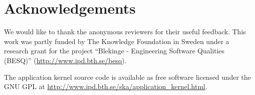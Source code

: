 \section*{Acknowledgements}
We would like to thank the anonymous reviewers for their useful feedback. This
work was partly funded by The Knowledge Foundation in Sweden under a research
grant for the project ``Blekinge - Engineering Software Qualities (BESQ)''
(\url{http://www.ipd.bth.se/besq}).

\noindent
The application kernel source code is available as free software licensed
under the GNU GPL at
\url{http://www.ipd.bth.se/ska/application_kernel.html}.
